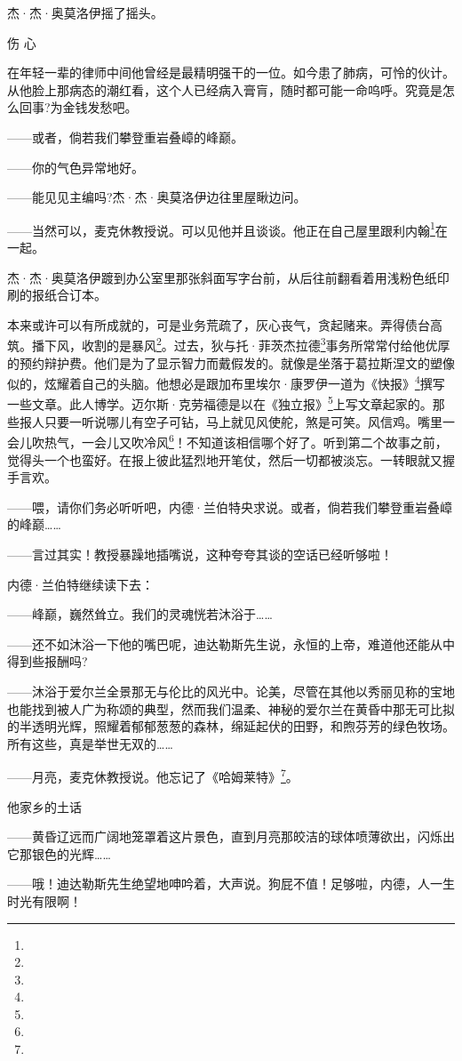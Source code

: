 \par 杰·杰·奥莫洛伊摇了摇头。
\par 伤 心
\par 在年轻一辈的律师中间他曾经是最精明强干的一位。如今患了肺病，可怜的伙计。从他脸上那病态的潮红看，这个人已经病入膏肓，随时都可能一命呜呼。究竟是怎么回事?为金钱发愁吧。
\par ——或者，倘若我们攀登重岩叠嶂的峰巅。
\par ——你的气色异常地好。
\par ——能见见主编吗?杰·杰·奥莫洛伊边往里屋瞅边问。
\par ——当然可以，麦克休教授说。可以见他并且谈谈。他正在自己屋里跟利内翰\footnote{}在一起。
\par 杰·杰·奥莫洛伊踱到办公室里那张斜面写字台前，从后往前翻看着用浅粉色纸印刷的报纸合订本。
\par 本来或许可以有所成就的，可是业务荒疏了，灰心丧气，贪起赌来。弄得债台高筑。播下风，收割的是暴风\footnote{}。过去，狄与托·菲茨杰拉德\footnote{}事务所常常付给他优厚的预约辩护费。他们是为了显示智力而戴假发的。就像是坐落于葛拉斯涅文的塑像似的，炫耀着自己的头脑。他想必是跟加布里埃尔·康罗伊一道为《快报》\footnote{}撰写一些文章。此人博学。迈尔斯·克劳福德是以在《独立报》\footnote{}上写文章起家的。那些报人只要一听说哪儿有空子可钻，马上就见风使舵，煞是可笑。风信鸡。嘴里一会儿吹热气，一会儿又吹冷风\footnote{}！不知道该相信哪个好了。听到第二个故事之前，觉得头一个也蛮好。在报上彼此猛烈地开笔仗，然后一切都被淡忘。一转眼就又握手言欢。
\par ——喂，请你们务必听听吧，内德·兰伯特央求说。或者，倘若我们攀登重岩叠嶂的峰巅……
\par ——言过其实！教授暴躁地插嘴说，这种夸夸其谈的空话已经听够啦！
\par 内德·兰伯特继续读下去：
\par ——峰巅，巍然耸立。我们的灵魂恍若沐浴于……
\par ——还不如沐浴一下他的嘴巴呢，迪达勒斯先生说，永恒的上帝，难道他还能从中得到些报酬吗?
\par ——沐浴于爱尔兰全景那无与伦比的风光中。论美，尽管在其他以秀丽见称的宝地也能找到被人广为称颂的典型，然而我们温柔、神秘的爱尔兰在黄昏中那无可比拟的半透明光辉，照耀着郁郁葱葱的森林，绵延起伏的田野，和煦芬芳的绿色牧场。所有这些，真是举世无双的……
\par ——月亮，麦克休教授说。他忘记了《哈姆莱特》\footnote{}。
\par 他家乡的土话
\par ——黄昏辽远而广阔地笼罩着这片景色，直到月亮那皎洁的球体喷薄欲出，闪烁出它那银色的光辉……
\par ——哦！迪达勒斯先生绝望地呻吟着，大声说。狗屁不值！足够啦，内德，人一生时光有限啊！
